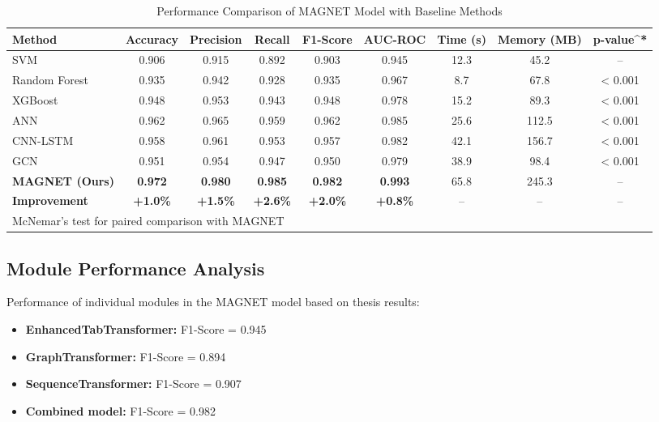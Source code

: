 \documentclass[a4paper,11pt]{article}
\begin{document}
\begin{table}[!htb]
  \centering
  \caption{Performance Comparison of MAGNET Model with Baseline Methods}
  \label{tab:baseline_comparison}
  \begin{tabular}{@{}lcccccccc@{}}
    \toprule
    \textbf{Method} & \textbf{Accuracy} & \textbf{Precision} & \textbf{Recall} & \textbf{F1-Score} & \textbf{AUC-ROC} & \textbf{Time (s)} & \textbf{Memory (MB)} & \textbf{p-value}^* \\
    \midrule
    SVM~\cite{DrebinPaper} & 0.906 & 0.915 & 0.892 & 0.903 & 0.945 & 12.3 & 45.2 & -- \\
    Random Forest~\cite{AndroidMalwareSurvey} & 0.935 & 0.942 & 0.928 & 0.935 & 0.967 & 8.7 & 67.8 & < 0.001 \\
    XGBoost~\cite{AndroidMalwareSurvey} & 0.948 & 0.953 & 0.943 & 0.948 & 0.978 & 15.2 & 89.3 & < 0.001 \\
    ANN~\cite{DeepLearningMalware} & 0.962 & 0.965 & 0.959 & 0.962 & 0.985 & 25.6 & 112.5 & < 0.001 \\
    CNN-LSTM~\cite{Vinayakumar2019} & 0.958 & 0.961 & 0.953 & 0.957 & 0.982 & 42.1 & 156.7 & < 0.001 \\
    GCN~\cite{Kipf2017} & 0.951 & 0.954 & 0.947 & 0.950 & 0.979 & 38.9 & 98.4 & < 0.001 \\
    \midrule
    \textbf{MAGNET (Ours)} & \textbf{0.972} & \textbf{0.980} & \textbf{0.985} & \textbf{0.982} & \textbf{0.993} & 65.8 & 245.3 & -- \\
    \midrule
    \textbf{Improvement} & \textbf{+1.0\%} & \textbf{+1.5\%} & \textbf{+2.6\%} & \textbf{+2.0\%} & \textbf{+0.8\%} & -- & -- & -- \\
    \bottomrule
    \multicolumn{9}{l}{\footnotesize *McNemar's test for paired comparison with MAGNET}
  \end{tabular}
\end{table}

\subsection{Module Performance Analysis}
Performance of individual modules in the MAGNET model based on thesis results:
\begin{itemize}
    \item \textbf{EnhancedTabTransformer:} F1-Score = 0.945
    \item \textbf{GraphTransformer:} F1-Score = 0.894
    \item \textbf{SequenceTransformer:} F1-Score = 0.907
    \item \textbf{Combined model:} F1-Score = 0.982
\end{itemize}
\end{document}

